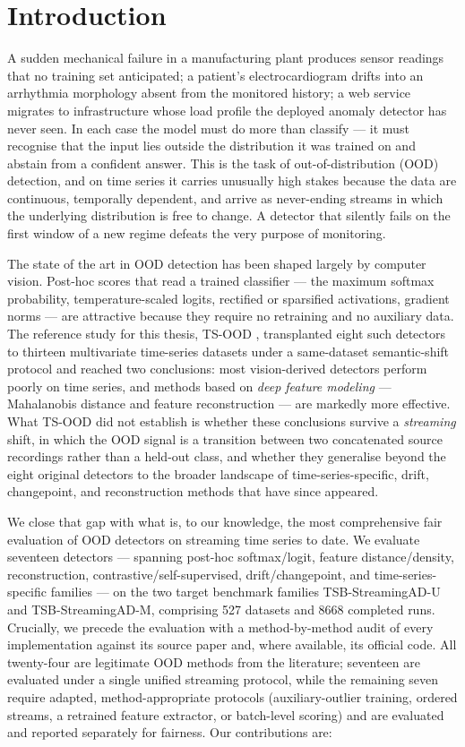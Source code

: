\documentclass[11pt]{article}
\begin{document}
\section{Introduction}\label{sec:intro}

A sudden mechanical failure in a manufacturing plant produces sensor readings that
no training set anticipated; a patient's electrocardiogram drifts into an
arrhythmia morphology absent from the monitored history; a web service migrates to
infrastructure whose load profile the deployed anomaly detector has never seen. In
each case the model must do more than classify --- it must recognise that the
input lies outside the distribution it was trained on and abstain from a confident
answer. This is the task of out-of-distribution (OOD) detection, and on time
series it carries unusually high stakes because the data are continuous, temporally
dependent, and arrive as never-ending streams in which the underlying distribution
is free to change. A detector that silently fails on the first window of a new
regime defeats the very purpose of monitoring.

The state of the art in OOD detection has been shaped largely by computer vision.
Post-hoc scores that read a trained classifier --- the maximum softmax probability,
temperature-scaled logits, rectified or sparsified activations, gradient norms ---
are attractive because they require no retraining and no auxiliary data. The
reference study for this thesis, TS-OOD \citep{Gungor2025}, transplanted eight such
detectors to thirteen multivariate time-series datasets under a same-dataset
semantic-shift protocol and reached two conclusions: most vision-derived detectors
perform poorly on time series, and methods based on \emph{deep feature modeling} ---
Mahalanobis distance \citep{Lee2018} and feature reconstruction \citep{Ahuja2019}
--- are markedly more effective. What TS-OOD did not establish is whether these
conclusions survive a \emph{streaming} shift, in which the OOD signal is a transition
between two concatenated source recordings rather than a held-out class, and whether
they generalise beyond the eight original detectors to the broader landscape of
time-series-specific, drift, changepoint, and reconstruction methods that have since
appeared.

We close that gap with what is, to our knowledge, the most comprehensive fair
evaluation of OOD detectors on streaming time series to date. We evaluate
seventeen detectors --- spanning post-hoc softmax/logit, feature distance/density,
reconstruction, contrastive/self-supervised, drift/changepoint, and
time-series-specific families --- on the two target benchmark families
TSB-StreamingAD-U and TSB-StreamingAD-M, comprising \num{527} datasets and
\num{8668} completed runs. Crucially, we precede the evaluation with a
method-by-method audit of every implementation against its source paper and, where
available, its official code. All twenty-four are legitimate OOD methods from the
literature; seventeen are evaluated under a single unified streaming protocol, while
the remaining seven require adapted, method-appropriate protocols
(auxiliary-outlier training, ordered streams, a retrained feature extractor, or
batch-level scoring) and are evaluated and reported separately for fairness. Our
contributions are:
\end{document}
